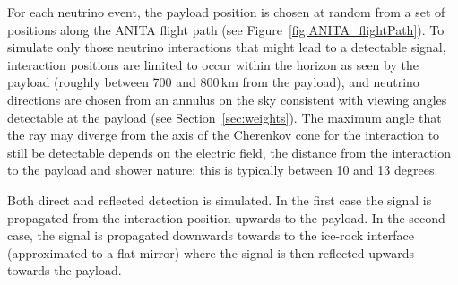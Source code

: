 For each neutrino event, the payload position is chosen at random from a set of positions along the ANITA flight path (see Figure~\ref{fig:ANITA_flightPath}).
To simulate only those neutrino interactions that might lead to a detectable signal, interaction positions are limited to occur within the horizon as seen by the payload (roughly between 700 and 800\,km from the payload), and neutrino directions are chosen from an annulus on the sky consistent with viewing angles detectable at the payload (see Section~\ref{sec:weights}). 
The maximum angle that the ray may diverge from the axis of the Cherenkov cone for the interaction to still be detectable depends on the electric field, the distance from the interaction to the payload and shower nature: this is typically between 10 and 13 degrees.

Both direct and reflected detection is simulated.
In the first case the signal is propagated from the interaction position upwards to the payload. In the second case, the signal is propagated downwards
towards to the ice-rock interface (approximated to a flat mirror)
where the signal is then reflected upwards towards the payload. 




